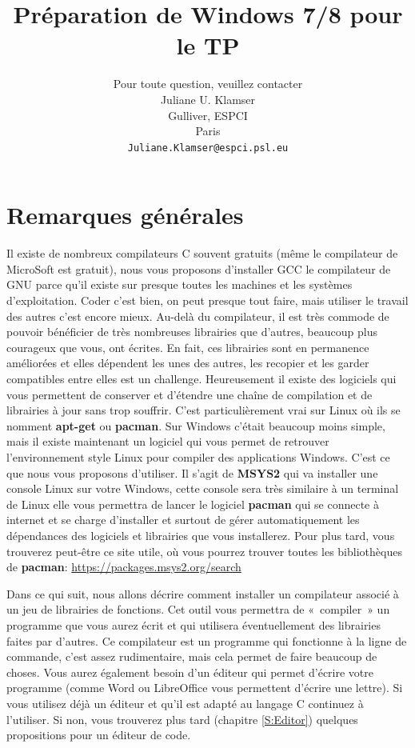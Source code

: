 \documentclass{article}
\title{Préparation de Windows 7/8 pour le TP}
\author{
Pour toute question, veuillez contacter\\
 Juliane U. Klamser\\%
  Gulliver,  ESPCI\\
  Paris \\
  \texttt{Juliane.Klamser@espci.psl.eu} \\
}
\begin{document}
\maketitle

\tableofcontents



\newpage
\section{Remarques générales}
Il existe de nombreux compilateurs C souvent gratuits (même le compilateur de MicroSoft est gratuit), nous vous proposons d'installer GCC le compilateur de GNU parce qu'il existe sur presque toutes les machines et les systèmes d'exploitation. Coder c'est bien, on peut presque tout faire, mais utiliser le travail des autres c'est encore mieux. Au-delà du compilateur, il est très commode de pouvoir bénéficier de très nombreuses librairies que d'autres, beaucoup plus courageux que vous, ont écrites. En fait, ces librairies sont en permanence améliorées et elles dépendent les unes des autres, les recopier et les garder compatibles entre elles est un challenge. 
Heureusement il existe des logiciels qui vous permettent de conserver et d'étendre une chaîne de compilation et de librairies à jour sans trop souffrir. C'est particulièrement vrai sur Linux où ils se nomment \textbf{apt-get} ou \textbf{pacman}. Sur Windows c'était beaucoup moins simple, mais il existe maintenant un logiciel qui vous permet de retrouver l’environnement style Linux pour compiler des applications Windows. C'est ce que nous vous proposons d'utiliser. Il s'agit de \textbf{MSYS2} qui va installer une console Linux sur votre Windows, cette console sera très similaire à un terminal de Linux elle vous permettra de lancer le logiciel \textbf{pacman} qui se connecte à internet et se charge d'installer et surtout de gérer automatiquement les dépendances des logiciels et librairies que vous installerez. Pour plus tard, vous trouverez peut-être ce site utile, où vous pourrez trouver toutes les bibliothèques de \textbf{pacman}: \href{https://packages.msys2.org/search}{https://packages.msys2.org/search}

Dans ce qui suit, nous allons décrire comment installer un compilateur associé à un jeu de librairies de fonctions. Cet outil vous permettra de « compiler » un programme que vous aurez écrit et qui utilisera éventuellement des librairies faites par d'autres. Ce compilateur est un programme qui fonctionne à la ligne de commande, c'est assez rudimentaire, mais cela permet de faire beaucoup de choses. Vous aurez également besoin d'un éditeur qui permet d'écrire votre programme (comme Word ou LibreOffice vous permettent d'écrire une lettre). Si vous utilisez déjà un éditeur et qu'il est adapté au langage C continuez à l'utiliser. Si non, vous trouverez plus tard (chapitre \ref{S:Editor}) quelques propositions pour un éditeur de code.
\end{document}
